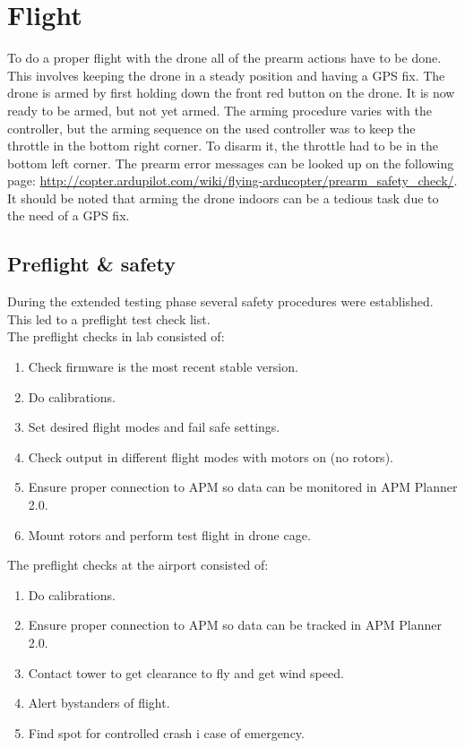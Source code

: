 \section{Flight}
To do a proper flight with the drone all of the prearm actions have to be done. This involves
keeping the drone in a steady position and having a GPS fix. The drone is armed by first
holding down the front red button on the drone. It is now ready to be armed, but not yet armed.
The arming procedure varies with the controller, but the arming sequence on the used controller
was to keep the throttle in the bottom right corner. To disarm it, the throttle had to be in the
bottom
left corner. The prearm error messages can be looked up on the following page:
\url{http://copter.ardupilot.com/wiki/flying-arducopter/prearm_safety_check/}. It should be noted
that arming the drone indoors can be a tedious task due to the need of a GPS fix.\\

\subsection{Preflight \& safety}
During the extended testing phase several safety procedures were established. This led to a
preflight test check list.\\
The preflight checks in lab consisted of:
\begin{enumerate}
\item Check firmware is the most recent stable version.
\item Do calibrations.
\item Set desired flight modes and fail safe settings.
\item Check output in different flight modes with motors on (no rotors).
\item Ensure proper connection to APM so data can be monitored in APM Planner 2.0.
\item Mount rotors and perform test flight in drone cage.
\end{enumerate}

The preflight checks at the airport consisted of:
\begin{enumerate}
\item Do calibrations.
\item Ensure proper connection to APM so data can be tracked in APM Planner 2.0.
\item Contact tower to get clearance to fly and get wind speed.
\item Alert bystanders of flight.
\item Find spot for controlled crash i case of emergency.
\end{enumerate}

